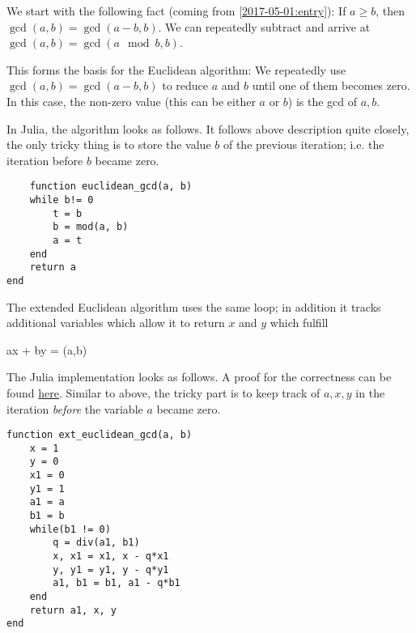 
We start with the following fact (coming from \ref{2017-05-01:entry}): If $a \geq b$, then $\gcd(a,b) = \gcd(a-b, b)$. We can repeatedly subtract and arrive at $\gcd(a,b) = \gcd(a \mod b, b)$.

This forms the basis for the Euclidean algorithm: We repeatedly use $\gcd(a,b) = \gcd(a-b, b)$ to reduce $a$ and $b$ until one of them becomes zero. In this case, the non-zero value (this can be either $a$ or $b$) is the gcd of $a, b$.

In Julia, the algorithm looks as follows. It follows above description quite closely, the only tricky thing is to store the value $b$ of the previous iteration; i.e. the iteration before $b$ became zero.

\begin{verbatim}
    function euclidean_gcd(a, b)
    while b!= 0
        t = b
        b = mod(a, b)
        a = t
    end
    return a
end
\end{verbatim}

The extended Euclidean algorithm uses the same loop; in addition it tracks additional variables which allow it to return $x$ and $y$ which fulfill

\bee
ax + by = \gcd(a,b)
\eee

The Julia implementation looks as follows. A proof for the correctness can be found \href{https://en.wikipedia.org/wiki/Extended_Euclidean_algorithm}{here}. Similar to above, the tricky part is to keep track of $a, x, y$ in the iteration \emph{before} the variable $a$ became zero.

\begin{verbatim}
function ext_euclidean_gcd(a, b)
    x = 1
    y = 0
    x1 = 0
    y1 = 1
    a1 = a
    b1 = b
    while(b1 != 0)
        q = div(a1, b1)
        x, x1 = x1, x - q*x1
        y, y1 = y1, y - q*y1
        a1, b1 = b1, a1 - q*b1
    end
    return a1, x, y
end
\end{verbatim}




